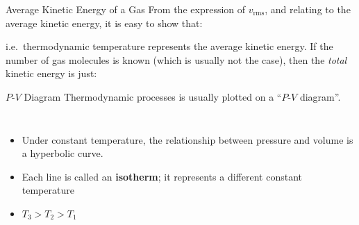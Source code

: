 \documentclass[12pt,aspectratio=169]{beamer}
\newcommand{\eq}[2]{\vspace{#1}{\Large\begin{displaymath}#2\end{displaymath}}}
\begin{document}
\begin{frame}{Average Kinetic Energy of a Gas}
  From the expression of $v_\text{rms}$, and relating to the average kinetic
  energy, it is easy to show that:
  
  \eq{-.2in}{
    \langle K \rangle=\frac12v_\text{rms}^2=
    \frac12\left(\sqrt{\frac{3k_BT}m}\right)^2
    \quad\rightarrow\quad
    \boxed{\langle K\rangle=\frac32k_BT}
  }

  i.e.\ thermodynamic temperature represents the average kinetic energy. If the
  number of gas molecules is known (which is usually not the case), then the
  \emph{total} kinetic energy is just:

  \eq{-.2in}{
    K=N\langle K\rangle=\frac32Nk_BT
  }
\end{frame}



\begin{frame}{$P$-$V$ Diagram}
  Thermodynamic processes is usually plotted on a ``$P$-$V$ diagram''.
  \begin{columns}

    \begin{itemize}
    \item Under constant temperature, the relationship between pressure and
      volume is a hyperbolic curve.
    \item Each line is called an \textbf{isotherm}; it represents a different
      constant temperature
    \item $T_3>T_2>T_1$
    \end{itemize}
  \end{columns}
  
\end{frame}
\end{document}
